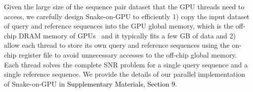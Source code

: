Given the large size of the sequence pair dataset that the GPU threads need to access, we carefully design Snake-on-GPU to efficiently 1) copy the input dataset of query and reference sequences into the GPU global memory, which is the off-chip DRAM memory of GPUs~\citep{cuda-guide} and it typically fits a few GB of data and 2) allow each thread to store its own query and reference sequences using the on-chip register file to avoid unnecessary accesses to the off-chip global memory. Each thread solves the complete SNR problem for a single query sequence and a single reference  sequence.
We provide the details of our parallel implementation of Snake-on-GPU in \textcolor{black}{Supplementary Materials, Section 9}.


